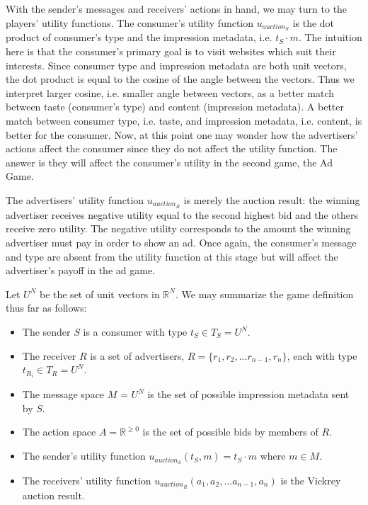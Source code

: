 \documentclass{article}
\begin{document}
With the sender's messages and receivers' actions in hand, we may turn to the players' utility functions. The consumer's utility function $u_{auction_S}$ is the dot product of consumer's type and the impression metadata, i.e. $t_S \cdot m$. The intuition here is that the consumer's primary goal is to visit websites which suit their interests. Since consumer type and impression metadata are both unit vectors, the dot product is equal to the cosine of the angle between the vectors. Thus we interpret larger cosine, i.e. smaller angle between vectors, as a better match between taste (consumer's type) and content (impression metadata). A better match between consumer type, i.e. taste, and impression metadata, i.e. content, is better for the consumer. Now, at this point one may wonder how the advertisers' actions affect the consumer since they do not affect the utility function. The answer is they will affect the consumer's utility in the second game, the Ad Game.

The advertisers' utility function $u_{auction_R}$ is merely the auction result: the winning advertiser receives negative utility equal to the second highest bid and the others receive zero utility. The negative utility corresponds to the amount the winning advertiser must pay in order to show an ad. Once again, the consumer's message and type are absent from the utility function at this stage but will affect the advertiser's payoff in the ad game.

Let $U^N$ be the set of unit vectors in $\mathbb{R}^N$. We may summarize the game definition thus far as follows:

\begin{itemize}
	\item The sender $S$ is a consumer with type $t_S \in T_S = U^N$.
	\item The receiver $R$ is a set of advertisers, $R = \{r_1, r_2, ... r_{n-1}, r_n \}$, each with type $t_{R_i} \in T_R = U^N$.
	\item The message space $M$ = $U^N$ is the set of possible impression metadata sent by $S$.
	\item The action space $A = \mathbb{R}^{\ge 0}$ is the set of possible bids by members of $R$.
	\item The sender's utility function $u_{auction_S}(t_S, m) = t_S \cdot m$ where $m \in M$.
	\item The receivers' utility function $u_{auction_R}(a_1, a_2, ... a_{n-1}, a_n)$ is the Vickrey auction result.
\end{itemize}
\end{document}
